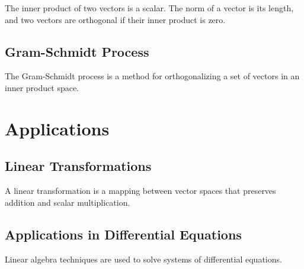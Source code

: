 \documentclass{article}
\begin{document}
The inner product of two vectors is a scalar. The norm of a vector is its length, and two vectors are orthogonal if their inner product is zero.

\subsection{Gram-Schmidt Process}

The Gram-Schmidt process is a method for orthogonalizing a set of vectors in an inner product space.

\section{Applications}

\subsection{Linear Transformations}

A linear transformation is a mapping between vector spaces that preserves addition and scalar multiplication.

\subsection{Applications in Differential Equations}

Linear algebra techniques are used to solve systems of differential equations.
\end{document}

